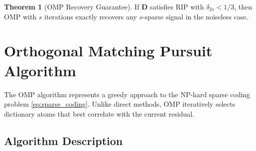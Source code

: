 \documentclass[12pt]{article}
\theoremstyle{definition}
\newtheorem{theorem}{Theorem}[section]
\begin{document}
\begin{theorem}[OMP Recovery Guarantee]
    \label{thm:omp_recovery}
    If $\mathbf{D}$ satisfies RIP with $\delta_{2s} < 1/3$, then OMP with $s$ iterations exactly recovers any $s$-sparse signal in the noiseless case.
\end{theorem}

\newpage

\section{Orthogonal Matching Pursuit Algorithm}
\label{sec:omp_algorithm}

The OMP algorithm represents a greedy approach to the NP-hard sparse coding problem \eqref{eq:sparse_coding}. Unlike direct methods, OMP iteratively selects dictionary atoms that best correlate with the current residual.

\subsection{Algorithm Description}
\label{subsec:algorithm_description}
\end{document}
